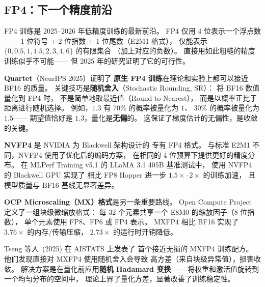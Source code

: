 \subsection{FP4：下一个精度前沿}
\label{sec:fp4-training}

FP4 训练是 2025--2026 年低精度训练的最新前沿。
FP4 仅用 4 位表示一个浮点数——
1 位符号 + 2 位指数 + 1 位尾数（E2M1 格式），
仅能表示 $\{0, 0.5, 1, 1.5, 2, 3, 4, 6\}$ 的有限集合
（加上对应的负数）。
直接用如此粗糙的精度训练似乎不可能——
但 2025 年的研究证明了它的可行性。

\textbf{Quartet}（NeurIPS 2025）证明了%
\textbf{原生 FP4 训练}在理论和实验上都可以接近 BF16 的质量。
关键技巧是\textbf{随机舍入}（Stochastic Rounding, SR）：
将 BF16 数值量化到 FP4 时，
不是简单地取最近值（Round to Nearest），
而是以概率正比于距离进行随机选择。
例如，$1.3$ 有 70\% 的概率被量化为 $1$、
30\% 的概率被量化为 $1.5$——
期望值恰好是 $1.3$，量化是\textbf{无偏}的。
这保证了梯度估计的无偏性，是收敛的关键。

\textbf{NVFP4} 是 NVIDIA 为 Blackwell 架构设计的
专有 FP4 格式。%
与标准 E2M1 不同，NVFP4 使用了优化后的编码方案，
在相同的 4 位预算下提供更好的精度分布。
在 MLPerf Training v5.1 的 LLaMA 3.1 405B 基准测试中，
使用 NVFP4 的 Blackwell GPU 实现了
相比 FP8 Hopper 进一步 $1.5\times$--$2\times$ 的训练加速，
且模型质量与 BF16 基线无显著差异。

\textbf{OCP Microscaling（MX）格式}是另一条重要路线。%
Open Compute Project 定义了一组块级微缩放格式：
每 32 个元素共享一个 E8M0 的缩放因子（8 位指数），
单个元素使用 FP8、FP6 或 FP4 表示。
MXFP4 相比 BF16 实现了 $3.76\times$ 的内存/传输压缩，
$2.73\times$ 的运行时开销降低。

Tseng 等人~(2025) 在 AISTATS 上发表了%
首个接近无损的 MXFP4 训练配方。
他们发现直接对 MXFP4 使用随机舍入会导致
高方差（来自块级异常值），损害收敛。
解决方案是在量化前应用\textbf{随机 Hadamard 变换}——
将权重和激活值旋转到一个均匀分布的空间中，
理论上界了量化方差，显著改善了训练稳定性。


